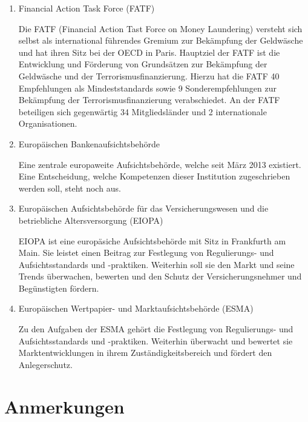 \documentclass{article}
\begin{document}
            \begin{enumerate}

                \item Financial Action Task Force (FATF)

                    Die FATF (Financial Action Tast Force on Money Laundering) versteht sich selbst als international führendes Gremium zur Bekämpfung der Geldwäsche und hat ihren Sitz bei der OECD in Paris. Hauptziel der FATF ist die Entwicklung und Förderung von Grundsätzen zur Bekämpfung der Geldwäsche und der Terrorismusfinanzierung. Hierzu hat die FATF 40 Empfehlungen als Mindeststandards sowie 9 Sonderempfehlungen zur Bekämpfung der Terrorismusfinanzierung verabschiedet. An der FATF beteiligen sich gegenwärtig 34 Mitgliedsländer und 2 internationale Organisationen.

                \item Europäischen Bankenaufsichtsbehörde

                    Eine zentrale europaweite Aufsichtsbehörde, welche seit März 2013 existiert. Eine Entscheidung, welche Kompetenzen dieser Institution zugeschrieben werden soll, steht noch aus. \cite{EuBaAuf}

                \item Europäischen Aufsichtsbehörde für das Versicherungswesen und die betriebliche Altersversorgung (EIOPA)

                    EIOPA ist eine europäsiche Aufsichtsbehörde mit Sitz in Frankfurth am Main. Sie leistet einen Beitrag zur Festlegung von Regulierungs- und Aufsichtsstandards und -praktiken. Weiterhin soll sie den Markt und seine Trends überwachen, bewerten und den Schutz der Versicherungsnehmer und Begünstigten fördern. \cite{EuVeAu}

                \item Europäischen Wertpapier- und Marktaufsichtsbehörde (ESMA)

                    Zu den Aufgaben der ESMA gehört die Festlegung von Regulierungs- und Aufsichtsstandards und -praktiken. Weiterhin überwacht und bewertet sie Marktentwicklungen in ihrem Zuständigkeitsbereich und fördert den Anlegerschutz. \cite{EuWeAu}

            \end{enumerate}        

\newpage

    \section[Anmerkungen]{Anmerkungen}
\end{document}
